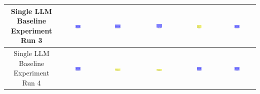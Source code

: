 \begin{table}[H]
\begin{tabular}{|c|c|c|c|c|c|}
    Single LLM Baseline Experiment Run 3 & \includegraphics[width=0.15\textwidth]{./run_3/png/gpt-4o_results/MicrofluidicChip.png} & \includegraphics[width=0.15\textwidth]{./run_3/png/claude-3-5-sonnet-20240620_results/MicrofluidicChip.png} & \includegraphics[width=0.15\textwidth]{./run_3/png/watsonx_meta-llama_llama-3-1-70b-instruct_results/MicrofluidicChip.png} & \includegraphics[width=0.15\textwidth]{./run_3/png/watsonx_meta-llama_llama-3-405b-instruct_results/MicrofluidicChip.png} & \includegraphics[width=0.15\textwidth]{./run_3/png/o1-preview_results/MicrofluidicChip.png} \\
    \hline
    Single LLM Baseline Experiment Run 4 & \includegraphics[width=0.15\textwidth]{./run_4/png/gpt-4o_results/MicrofluidicChip.png} & \includegraphics[width=0.15\textwidth]{./run_4/png/claude-3-5-sonnet-20240620_results/MicrofluidicChip.png} & \includegraphics[width=0.15\textwidth]{./run_4/png/watsonx_meta-llama_llama-3-1-70b-instruct_results/MicrofluidicChip.png} & \includegraphics[width=0.15\textwidth]{./run_4/png/watsonx_meta-llama_llama-3-405b-instruct_results/MicrofluidicChip.png} & \includegraphics[width=0.15\textwidth]{./run_4/png/o1-preview_results/MicrofluidicChip.png} \\

\end{tabular}
\end{table}
